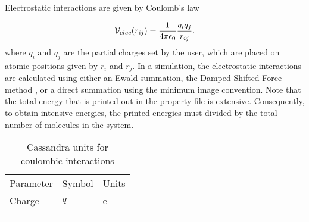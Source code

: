 Electrostatic interactions are given by  Coulomb's law

\begin{equation}
{\cal V}_{elec} (r_{ij}) = \frac{1}{4\pi\epsilon_0} \frac {q_i q_j} {r_{ij}}.
\label{Eq:Coulomb}
\end{equation}
where $q_i$ and $q_j$ are the partial charges set by the user, which are
placed on atomic positions given by $r_i$ and $r_j$. In a simulation,
the electrostatic interactions are calculated using either an Ewald
summation, the Damped Shifted Force method \cite{Fennell:2006}, or a direct summation using the minimum image convention. Note that 
the total energy that is printed out in the property file is extensive. 
Consequently, to obtain intensive energies, the printed energies must divided by 
the total number of molecules in the system. 

\begin{center}
\begin{table}[h]
	\begin{center}
	\caption{Cassandra units for coulombic interactions}
	\begin{tabular} {l l l} \\ \hline \hline
	 Parameter & Symbol &  Units \\
	Charge &	 $q$ & e \\ \\ \hline \\
	\end{tabular}
	\end{center}
	\label{Tab:Coulombic_Units}
\end{table}
\end{center}


